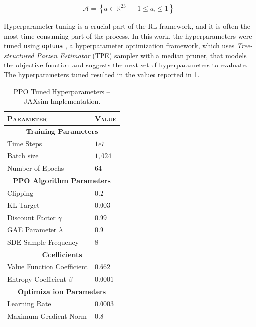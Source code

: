\begin{equation}
    \label{eqn:ergocub_action_space}
    \mathcal{A} = \left\{ a \in \mathbb{R} ^{23} \mid -1 \leq a_i \leq 1 \right\}
\end{equation}

Hyperparameter tuning is a crucial part of the \ac{RL} framework, and it is often the most time-consuming part of the process. In this work, the hyperparameters were tuned using \texttt{optuna} \citep{akiba_optuna_2019}, a hyperparameter optimization framework, which uses \textit{Tree-structured Parzen Estimator} (\ac{TPE}) sampler with a median pruner, that models the objective function and suggests the next set of hyperparameters to evaluate. The hyperparameters tuned resulted in the values reported in \cref{tab:ppohyperparameters_jaxsim}.

\begin{table}[h]
    \centering
    \begin{tabular}{ll}
        \toprule
        \textsc{Parameter}          & \textsc{Value}          \\
        \midrule
        \multicolumn{2}{c}{\textbf{Training Parameters}}      \\
        Time Steps                  & $1e7$                   \\
        Batch size                  & $1,024$                 \\
        Number of Epochs            & $64$                    \\
        \midrule
        \multicolumn{2}{c}{\textbf{PPO Algorithm Parameters}} \\
        Clipping                    & $0.2$                   \\
        KL Target                   & $0.003$                 \\
        Discount Factor $\gamma$    & $0.99$                  \\
        GAE Parameter $\lambda$     & $0.9$                   \\
        SDE Sample Frequency        & $8$                     \\
        \midrule
        \multicolumn{2}{c}{\textbf{Coefficients}}             \\
        Value Function Coefficient  & $0.662$                 \\
        Entropy Coefficient $\beta$ & $0.0001$                \\
        \midrule
        \multicolumn{2}{c}{\textbf{Optimization Parameters}}  \\
        Learning Rate               & $0.0003$                \\
        Maximum Gradient Norm       & $0.8$                   \\
        \bottomrule
    \end{tabular}
    \caption{PPO Tuned Hyperparameters -- JAXsim Implementation.}
    \label{tab:ppohyperparameters_jaxsim}
\end{table}

